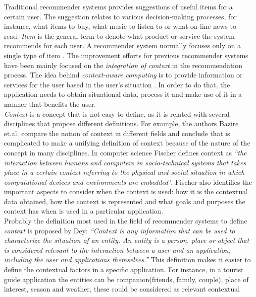 Traditional recommender systems provides suggestions of useful items
for a certain user. The suggestion relates to various decision-making
processes, for instance, what items to buy, what music to listen to or
what on-line news to read. \textit{Item} is the general term to denote
what product or service the system recommends for each user. A
recommender system normally focuses only on a single type of item
\cite{resnick1997recommender}.
The improvement efforts for previous recommender systems have been mainly
focused on the
\textit{integration of context} in the recommendation process. 
The idea behind \textit{context-aware computing} is to provide
information or services for the user based in the user's situation
\cite{dey2001understanding}. In order to do that, the application 
needs to obtain situational data, process it and make use of it 
in a manner that benefits the user. \\ 
\textit{Context} is a concept that is not easy to define, as it is related with
several disciplines that propose different definitions. For example,
the authors Bazire et.al.\cite{bazire2005understanding} compare the
notion of context in different fields and conclude that is complicated to make a
unifying definition of context because of the nature of the concept in
many disciplines. In computer science Fischer\cite{fischer2012context}
defines context as \textit{``the interaction between humans and
computers in socio-technical systems that takes place in a certain
context referring to the physical and social situation in which
computational devices and environments are embedded"}. Fischer also identifies
the important aspects to consider when the context is used: how it is
the contextual data obtained, how the context is represented and what
goals and purposes the context has when is used in a particular
application. \\
Probably the definition most used in the field of recommender systems to 
define \textit{context} is proposed by Dey\cite{dey2001understanding}:
\textit{``Context is any information that can be used to characterize
the situation of an entity. An entity is a person, place or object
that is considered relevant to the interaction between a user and  an
application, including the user and applications themselves.''}  This
definition makes it easier to define the contextual factors in a
specific application. For instance, in a tourist guide application the
entities can be companion(friends, family, couple), place of interest,
season and weather, these could be considered as relevant contextual

